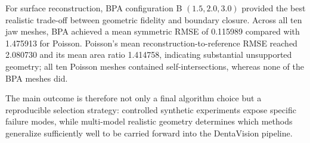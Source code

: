 For surface reconstruction, BPA configuration B $(1.5,2.0,3.0)$ provided the best realistic trade-off between geometric fidelity and boundary closure. Across all ten jaw meshes, BPA achieved a mean symmetric RMSE of 0.115989 compared with 1.475913 for Poisson. Poisson's mean reconstruction-to-reference RMSE reached 2.080730 and its mean area ratio 1.414758, indicating substantial unsupported geometry; all ten Poisson meshes contained self-intersections, whereas none of the BPA meshes did.

The main outcome is therefore not only a final algorithm choice but a reproducible selection strategy: controlled synthetic experiments expose specific failure modes, while multi-model realistic geometry determines which methods generalize sufficiently well to be carried forward into the DentaVision pipeline.
